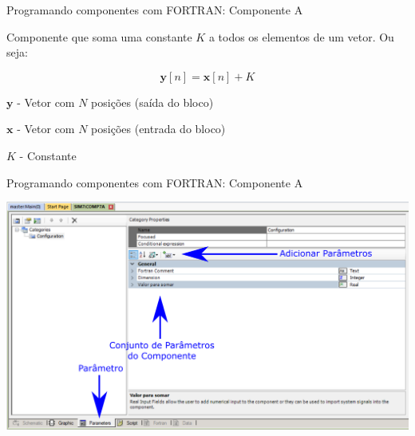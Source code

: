 \begin{frame}{Programando componentes com FORTRAN: Componente A}
\centering

Componente que soma uma constante $K$ a todos os elementos de um vetor. Ou seja:
\vspace*{0.5cm}

\begin{equation*}
\mathbf{y}[n] = \mathbf{x}[n] + K 
\end{equation*}
\vspace*{0.5cm}

$\mathbf{y}$ - Vetor com $N$ posições (saída do bloco)
\vspace*{0.5cm}

$\mathbf{x}$ - Vetor com $N$ posições (entrada do bloco)
\vspace*{0.5cm}

$K$ - Constante


\end{frame}





\begin{frame}{Programando componentes com FORTRAN: Componente A}
\centering

\includegraphics[width=0.75\linewidth]{./figuras/Componentes/FortranA_parameter}

\end{frame}




